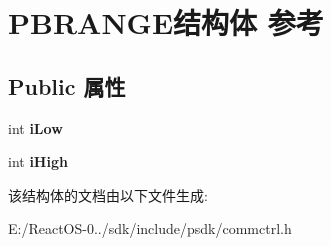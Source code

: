 \hypertarget{struct_p_b_r_a_n_g_e}{}\section{P\+B\+R\+A\+N\+G\+E结构体 参考}
\label{struct_p_b_r_a_n_g_e}
\subsection*{Public 属性}
\begin{DoxyCompactItemize}
\item 
\mbox{\label{struct_p_b_r_a_n_g_e_a404b19754d079d628dd812d579effb34}} 
int {\bfseries i\+Low}
\item 
\mbox{\label{struct_p_b_r_a_n_g_e_aa9f636e13864d1c7da5407b1d6549604}} 
int {\bfseries i\+High}
\end{DoxyCompactItemize}


该结构体的文档由以下文件生成\+:\begin{DoxyCompactItemize}
\item 
E\+:/\+React\+O\+S-\/0../sdk/include/psdk/commctrl.\+h\end{DoxyCompactItemize}

